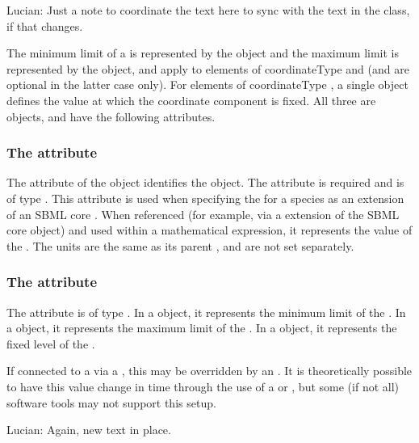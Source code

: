 {\color{red} Lucian: \notice Just a note to coordinate the text here to sync with the text in the \BoundaryCondition class, if that changes.  }

The minimum limit of a \CoordinateComponent is represented by the  object and the maximum limit is represented by the  object, and apply to \CoordinateComponent elements of coordinateType  and  (and are optional in the latter case only).  For \CoordinateComponent elements of coordinateType , a single  object defines the value at which the coordinate component is fixed.  All three are \Boundary objects, and have the following attributes.

\subsubsection{The  attribute}
The  attribute of the \Boundary object identifies the object. The attribute is required and is of type . This attribute is used when specifying the \BoundaryCondition for a species as an extension of an SBML core \Parameter.   When referenced (for example, via a \SpatialSymbolReference extension of the SBML core \Parameter object) and used within a mathematical expression, it represents the value of the \Boundary.  The units are the same as its parent \CoordinateComponent, and are not set separately.

\subsubsection{The  attribute}
The  attribute is of type . In a  object, it represents the minimum limit of the \CoordinateComponent.  In a  object, it represents the maximum limit of the \CoordinateComponent.  In a  object, it represents the fixed level of the \CoordinateComponent.

If connected to a \Parameter via a \SpatialSymbolReference, this  may be overridden by an \InitialAssignment.  It is theoretically possible to have this value change in time through the use of a \Rule or \Event, but some (if not all) software tools may not support this setup. 

{\color{red} Lucian: \notice Again, new text in place.}


